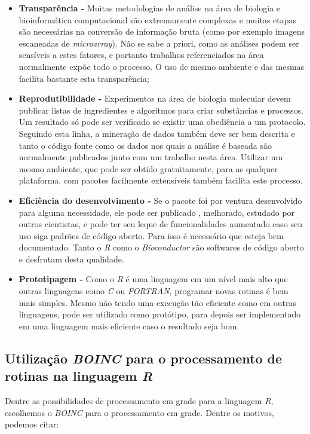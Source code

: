 \begin{itemize}
  \item \textbf{Transparência -} Muitas metodologias de análise na área de biologia e bioinformática computacional
são extremamente complexas e muitas etapas são necessárias na conversão de informação bruta (como por exemplo imagens 
escaneadas de \emph{microarray}). Não se sabe a priori, como as análises podem ser sensíveis a estes fatores, e portanto
trabalhos referenciados na área normalmente expõe todo o processo. O uso de mesmo ambiente e das mesmas facilita bastante
esta transparência;
  \item \textbf{Reprodutibilidade -} Experimentos na área de biologia molecular devem publicar listas de ingredientes
e algoritmos para criar substâncias e processos. Um resultado só pode ser verificado se existir uma obediência a 
um protocolo. Seguindo esta linha, a mineração de dados também deve ser bem descrita e tanto o código fonte 
como os dados nos quais a análise é baseada são normalmente publicados junto com um trabalho nesta área. Utilizar
um mesmo ambiente, que pode ser obtido gratuitamente, para as qualquer plataforma, com pacotes 
facilmente extensíveis também facilita este processo.
  \item \textbf{Eficiência do desenvolvimento -} Se o pacote foi por ventura desenvolvido para alguma necessidade, ele pode ser publicado
, melhorado, estudado por outros cientistas, e pode ter seu leque de funcionalidades aumentado caso seu uso siga padrões
de código aberto. Para isso é necessário que esteja bem documentado. Tanto o \emph{R} como o \emph{Bioconductor} são softwares
de código aberto e desfrutam desta qualidade.
  \item \textbf{Prototipagem -} Como o \emph{R} é uma linguagem em um nível mais alto que outras linguagens como \emph{C} ou
\emph{FORTRAN}, programar novas rotinas é bem mais simples. Mesmo não tendo uma execução tão eficiente como em outras
linguagens, pode ser utilizado como protótipo, para depois ser implementado em uma linguagem mais eficiente caso o 
resultado seja bom. 

\end{itemize}

\subsection{Utilização \emph{BOINC} para o processamento de rotinas na linguagem \emph{R}}

Dentre as possibilidades de processamento em grade para a linguagem \emph{R}, escolhemos o \emph{BOINC} para o processamento em grade.
Dentre os motivos, podemos citar:

